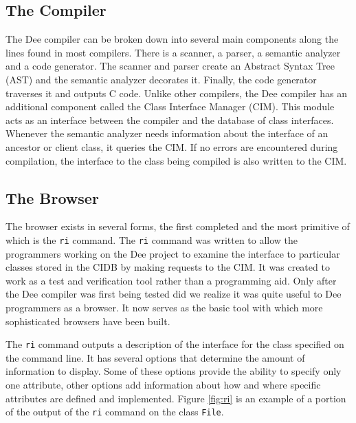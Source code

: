 \subsection{The Compiler}

The Dee compiler can be broken down into several main components along
the lines found in most compilers.  There is a scanner, a parser, a
semantic analyzer and a code generator.  The scanner and parser create
an Abstract Syntax Tree (AST) and the semantic analyzer decorates it.
Finally, the code generator traverses it and outputs C code.  Unlike
other compilers, the Dee compiler has an additional component called
the Class Interface Manager (CIM).  This module acts as an interface
between the compiler and the database of class interfaces.  Whenever
the semantic analyzer needs information about the interface of an
ancestor or client class, it queries the CIM.  If no errors are
encountered during compilation, the interface to the class being
compiled is also written to the CIM.

\subsection{The Browser}

The browser exists in several forms, the first completed and the most
primitive of which is the {\tt ri} command.  The {\tt ri} command was
written to allow the programmers working on the Dee project to examine
the interface to particular classes stored in the CIDB by making
requests to the CIM.  It was created to work as a test and verification
tool rather than a programming aid.  Only after the Dee compiler was
first being tested did we realize it was quite useful to Dee
programmers as a browser.  It now serves as the basic tool with which
more sophisticated browsers have been built.

The {\tt ri} command outputs a description of the interface for the
class specified on the command line.  It has several options that
determine the amount of information to display.  Some of these options
provide the ability to specify only one attribute, other options add
information about how and where specific attributes are defined and
implemented.  Figure \ref{fig:ri} is an example of a portion of the
output of the {\tt ri} command on the class {\tt File}.

